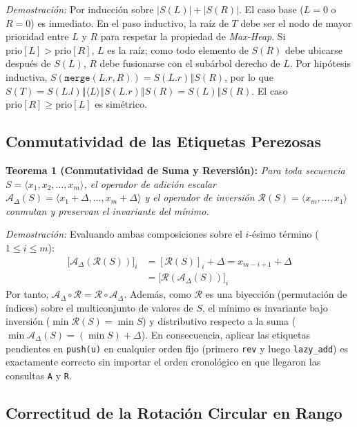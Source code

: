 \documentclass[journal,10pt,a4paper]{IEEEtran}
\begin{document}
\textit{Demostración:} Por inducción sobre $|S(L)| + |S(R)|$. El caso base ($L=0$ o $R=0$) es inmediato. En el paso inductivo, la raíz de $T$ debe ser el nodo de mayor prioridad entre $L$ y $R$ para respetar la propiedad de \textit{Max-Heap}. Si $\text{prio}[L] > \text{prio}[R]$, $L$ es la raíz; como todo elemento de $S(R)$ debe ubicarse después de $S(L)$, $R$ debe fusionarse con el subárbol derecho de $L$. Por hipótesis inductiva, $S(\texttt{merge}(L.r, R)) = S(L.r) \mathbin{\Vert} S(R)$, por lo que $S(T) = S(L.l) \mathbin{\Vert} \langle L \rangle \mathbin{\Vert} S(L.r) \mathbin{\Vert} S(R) = S(L) \mathbin{\Vert} S(R)$. El caso $\text{prio}[R] \ge \text{prio}[L]$ es simétrico. \IEEEQED

\subsection{Conmutatividad de las Etiquetas Perezosas}

\textbf{Teorema 1 (Conmutatividad de Suma y Reversión):} \textit{Para toda secuencia $S = \langle x_1, x_2, \dots, x_m \rangle$, el operador de adición escalar $\mathcal{A}_\Delta(S) = \langle x_1 + \Delta, \dots, x_m + \Delta \rangle$ y el operador de inversión $\mathcal{R}(S) = \langle x_m, \dots, x_1 \rangle$ conmutan y preservan el invariante del mínimo.}

\textit{Demostración:} Evaluando ambas composiciones sobre el $i$-ésimo término ($1 \le i \le m$):
\begin{align}
    \big[\mathcal{A}_\Delta(\mathcal{R}(S))\big]_i &= [\mathcal{R}(S)]_i + \Delta = x_{m - i + 1} + \Delta \nonumber \\
    &= \big[\mathcal{R}(\mathcal{A}_\Delta(S))\big]_i
\end{align}
Por tanto, $\mathcal{A}_\Delta \circ \mathcal{R} = \mathcal{R} \circ \mathcal{A}_\Delta$. Además, como $\mathcal{R}$ es una biyección (permutación de índices) sobre el multiconjunto de valores de $S$, el mínimo es invariante bajo inversión ($\min \mathcal{R}(S) = \min S$) y distributivo respecto a la suma ($\min \mathcal{A}_\Delta(S) = (\min S) + \Delta$). En consecuencia, aplicar las etiquetas pendientes en \texttt{push(u)} en cualquier orden fijo (primero \texttt{rev} y luego \texttt{lazy\_add}) es exactamente correcto sin importar el orden cronológico en que llegaron las consultas \texttt{A} y \texttt{R}. \IEEEQED

\subsection{Correctitud de la Rotación Circular en Rango}
\end{document}
